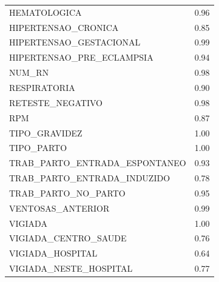 \documentclass{article}
\begin{document}
\begin{longtable}{lr}
HEMATOLOGICA                  &  0.96 \\
HIPERTENSAO\_CRONICA           &  0.85 \\
HIPERTENSAO\_GESTACIONAL       &  0.99 \\
HIPERTENSAO\_PRE\_ECLAMPSIA     &  0.94 \\
NUM\_RN                        &  0.98 \\
RESPIRATORIA                  &  0.90 \\
RETESTE\_NEGATIVO              &  0.98 \\
RPM                           &  0.87 \\
TIPO\_GRAVIDEZ                 &  1.00 \\
TIPO\_PARTO                    &  1.00 \\
TRAB\_PARTO\_ENTRADA\_ESPONTANEO &  0.93 \\
TRAB\_PARTO\_ENTRADA\_INDUZIDO   &  0.78 \\
TRAB\_PARTO\_NO\_PARTO           &  0.95 \\
VENTOSAS\_ANTERIOR             &  0.99 \\
VIGIADA                       &  1.00 \\
VIGIADA\_CENTRO\_SAUDE          &  0.76 \\
VIGIADA\_HOSPITAL              &  0.64 \\
VIGIADA\_NESTE\_HOSPITAL        &  0.77 \\
\end{longtable}
\end{document}
